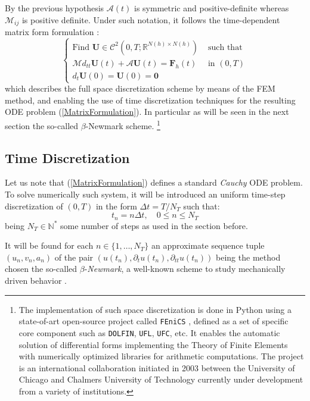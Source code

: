 By the previous hypothesis $\mathcal{A}(t)$ is symmetric and positive-definite whereas $\mathcal{M}_{ij}$ is positive definite. Under such notation, it follows the time-dependent matrix form formulation :
\begin{equation}
    \label{MatrixFormulation}
    \left \{
    \begin{array}{cc}
        \text{Find } \mathbf{U} \in \mathcal{C}^2(0,T; \mathbb{R}^{N(h)\times N(h)}) & \text{ such that} \\
        \mathcal{M} d_{tt} \mathbf{U}(t) + \mathcal{A}\mathbf{U}(t) = \mathbf{F}_h (t) & \text{ in }(0,T)\\ 
        d_{t} \mathbf{U}(0) = \mathbf{U}(0)  = \mathbf{0}&
    \end{array}
    \right.
\end{equation}
which describes the full space discretization scheme by means of the FEM method, and enabling the use of time discretization techniques for the resulting ODE problem (\ref{MatrixFormulation}). In particular as will be seen in the next section the so-called $\beta$-Newmark scheme. \footnote{The implementation of such space discretization is done in Python using a state-of-art open-source project called \texttt{FEniCS} \cite{logg2012automated}, defined as a set of specific core component such as \texttt{DOLFIN}, \texttt{UFL},  \texttt{UFC}, etc. It enables the automatic solution of differential forms implementing the Theory of Finite Elements with numerically optimized libraries for arithmetic computations. The project is an international collaboration initiated in 2003 between the University of Chicago and Chalmers University of Technology currently under development from a variety of institutions.}

\subsection{Time Discretization}
Let us note that (\ref{MatrixFormulation}) defines a standard \textit{Cauchy} ODE problem. To solve numerically such system, it will be introduced an uniform time-step discretization of $(0,T)$ in the form $\Delta t = T/N_T$ such that:
\begin{equation*}
    t_n = n \Delta t, \quad 0 \leq n \leq N_T
\end{equation*}
being $N_T \in \mathbb{N}^*$ some number of steps as used in the section before.

It will be found for each $n \in \{1,\dots, N_T \}$ an approximate sequence tuple $(u_n, v_n, a_n)$ of the pair $(u(t_n), \partial_{t} u(t_n), \partial_{tt} u(t_n))$ being the method chosen the so-called $\beta$-\textit{Newmark}, a well-known scheme to study mechanically driven behavior \cite{raviart1983introduction}.

